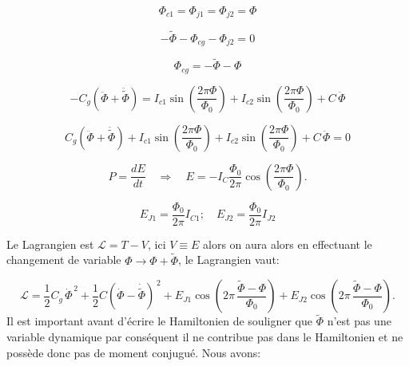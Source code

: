 \begin{equation}
\Phi_{c1} = \Phi_{j1} = \Phi_{j2} = \Phi
\label{sec:y}
\end{equation}

\begin{equation}
-\tilde{\Phi} - \Phi_{cg} - \Phi_{j2} = 0
\label{sec:z}
\end{equation}

\begin{equation}
\Phi_{cg} = -\tilde{\Phi} - \Phi
\end{equation}

\begin{equation}
- C_g \left( \ddot{\Phi} + \ddot{\tilde{\Phi}} \right)
= I_{c1} \sin\!\left(\frac{2\pi \Phi}{\Phi_0}\right)
+ I_{c2} \sin\!\left(\frac{2\pi \Phi}{\Phi_0}\right)
+ C \, \ddot{\Phi}
\end{equation}

\begin{equation}
C_g \left( \ddot{\Phi} + \ddot{\tilde{\Phi}} \right)
+ I_{c1} \sin\!\left(\frac{2\pi \Phi}{\Phi_0}\right)
+ I_{c2} \sin\!\left(\frac{2\pi \Phi}{\Phi_0}\right)
+ C \, \ddot{\Phi}
= 0
\end{equation}


\begin{equation}
P = \frac{dE}{dt}
\quad\Rightarrow\quad
E = -I_C\frac{\Phi_0}{2\pi} \cos\!\left(\frac{2\pi \Phi}{\Phi_0}\right).
\end{equation}

\begin{equation}
E_{J1}=\frac{\Phi_0}{2\pi}I_{C1} ; \quad  E_{J2}=\frac{\Phi_0}{2\pi}I_{J2}
\end{equation}

 Le Lagrangien est $\mathcal{L}= T-V$, ici $V \equiv E$ alors on aura alors 
en effectuant le changement de variable    $\Phi\rightarrow \Phi+\tilde{\Phi}$, le Lagrangien vaut:



\begin{equation}
\mathcal{L}
= \frac{1}{2} C_g\,\dot{\Phi}^{\,2}
+ \frac{1}{2} C(\dot{\Phi}-\dot{\tilde{\Phi}})^{\,2}
+ E_{J1} \cos\!\left( 2\pi\,\frac{\tilde{\Phi} - \Phi}{\Phi_0} \right)
+ E_{J2}\cos\!\left( 2\pi\,\frac{\tilde{\Phi} - {\Phi}}{\Phi_0} \right).
\label{sec:lag}
\end{equation}
Il est important avant d'écrire le Hamiltonien de souligner que $\tilde{\Phi}$ n'est pas une variable dynamique par conséquent il ne contribue pas dans le Hamiltonien et ne possède donc pas de moment conjugué. Nous avons:

